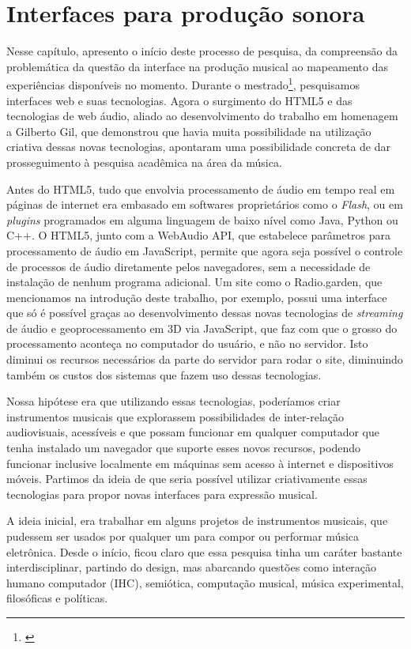 \chapter{Interfaces para produção sonora}
\label{ch:pesquisa}
Nesse capítulo, apresento o início deste processo de pesquisa, da compreensão da problemática da questão da interface na produção musical ao mapeamento das experiências disponíveis no momento. Durante o mestrado\footnote{\cite{Stolfi}}, pesquisamos interfaces web e suas tecnologias. Agora o surgimento do HTML5 e das tecnologias de web áudio, aliado ao desenvolvimento do trabalho em homenagem a Gilberto Gil, que demonstrou que havia muita possibilidade na utilização criativa dessas novas tecnologias, apontaram uma possibilidade concreta de dar prosseguimento à pesquisa acadêmica na área da música.

Antes do HTML5, tudo que envolvia processamento de áudio em tempo real em páginas de internet era embasado em softwares proprietários como o \emph{Flash}, ou em \emph{plugins} programados em alguma linguagem de baixo nível como Java, Python ou C++. O HTML5, junto com a WebAudio API, que estabelece parâmetros para processamento de áudio em JavaScript, permite que agora seja possível o controle de processos de áudio diretamente pelos navegadores, sem a necessidade de instalação de nenhum programa adicional. Um site como o Radio.garden, que mencionamos na introdução deste trabalho, por exemplo, possui uma interface que só é possível graças ao desenvolvimento dessas novas tecnologias de \emph{streaming} de áudio e geoprocessamento em 3D via JavaScript, que faz com que o grosso do processamento aconteça no computador do usuário, e não no servidor. Isto diminui os recursos necessários da parte do servidor para rodar o site, diminuindo também os custos dos sistemas que fazem uso dessas tecnologias.

Nossa hipótese era que utilizando essas tecnologias, poderíamos criar instrumentos musicais que explorassem possibilidades de inter-relação audiovisuais, acessíveis e que possam funcionar em qualquer computador que tenha instalado um navegador que suporte esses novos recursos, podendo funcionar inclusive localmente em máquinas sem acesso à internet e dispositivos móveis. Partimos da ideia de que seria possível utilizar criativamente essas tecnologias para propor novas interfaces para expressão musical.
    
A ideia inicial, era trabalhar em alguns projetos de instrumentos musicais, que pudessem ser usados por qualquer um para compor ou performar música eletrônica. Desde o início, ficou claro que essa pesquisa tinha um caráter bastante interdisciplinar, partindo do design, mas abarcando questões como interação humano computador (IHC), semiótica, computação musical, música experimental, filosóficas e políticas.

